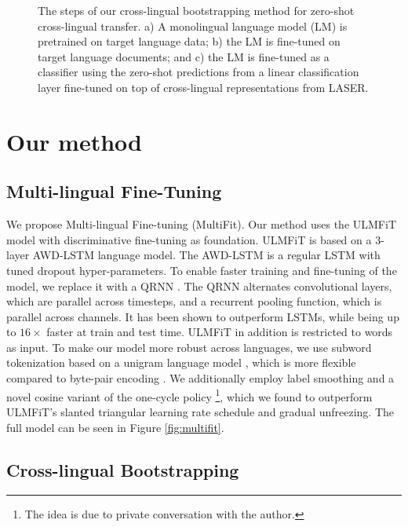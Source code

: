\documentclass[11pt,a4paper]{article}
\begin{document}
\begin{figure}
\centering

\caption{The steps of our cross-lingual bootstrapping method for zero-shot cross-lingual transfer. a) A monolingual language model (LM) is pretrained on target language data; b) the LM is fine-tuned on target language documents; and c) the LM is fine-tuned as a classifier using the zero-shot predictions from a linear classification layer fine-tuned on top of cross-lingual representations from LASER.}
\label{fig:pipeline}
\end{figure}

\section{Our method}

\subsection{Multi-lingual Fine-Tuning}

We propose Multi-lingual Fine-tuning (MultiFit). Our method uses the ULMFiT model \cite{Howard2018} with discriminative fine-tuning as foundation. ULMFiT is based on a 3-layer AWD-LSTM \cite{Merity2017} language model. The AWD-LSTM is a regular LSTM \cite{Hochreiter1997} with tuned dropout hyper-parameters. To enable faster training and fine-tuning of the model, we replace it with a QRNN \cite{Bradbury2017}. The QRNN alternates convolutional layers, which are parallel across timesteps, and a recurrent pooling function, which is parallel across channels. It has been shown to outperform LSTMs, while being up to $16\times$ faster at train and test time. ULMFiT in addition is restricted to words as input. To make our model more robust across languages, we use subword tokenization based on a unigram language model \cite{Kudo2018}, which is more flexible compared to byte-pair encoding \cite{Sennrich2016}. We additionally employ label smoothing \cite{Szegedy2016} and a novel cosine variant of the one-cycle policy \cite{smith2018disciplined}\footnote{The idea is due to private conversation with the author.}, which we found to outperform ULMFiT's slanted triangular learning rate schedule and gradual unfreezing. The full model can be seen in Figure \ref{fig:multifit}.

\subsection{Cross-lingual Bootstrapping}
\end{document}

